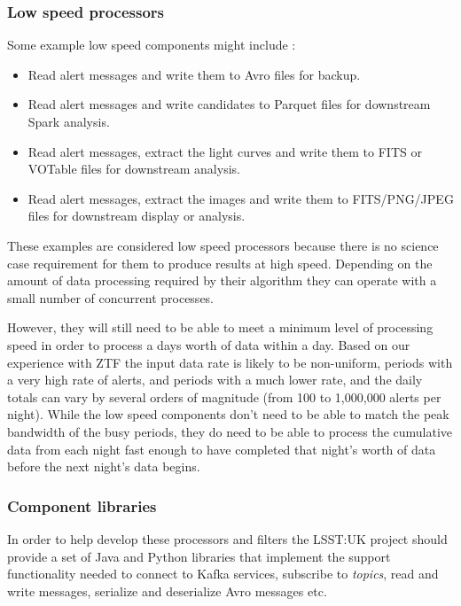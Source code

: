 \documentclass{article}
\newcommand{\avro} {Avro\xspace}
\newcommand{\fits} {FITS\xspace}
\newcommand{\parquet} {Parquet\xspace}
\newcommand{\votable} {VOTable\xspace}
\newcommand{\kafka} {Kafka\xspace}
\newcommand{\spark} {Spark\xspace}
\newcommand{\kftopics} {\textit{topics}\xspace}
\newcommand{\serz}      {serialize\xspace}
\newcommand{\deserz}    {deserialize\xspace}
\newcommand{\ztf} {ZTF\xspace}
\newcommand{\lsstuk} {LSST:UK\xspace}
\begin{document}
\subsubsection{Low speed processors}
\label{stage-2.low-speed.processors}

Some example low speed components might include :
\begin{itemize}
  \item Read alert messages and write them to \avro files for backup.
  \item Read alert messages and write candidates to \parquet files for downstream \spark analysis.
  \item Read alert messages, extract the light curves and write them to \fits or \votable files for downstream analysis.
  \item Read alert messages, extract the images and write them to FITS/PNG/JPEG files for downstream display or analysis.
\end{itemize}

These examples are considered low speed processors because there is no science case requirement for them to produce results at high speed. Depending on the amount of data processing required by their algorithm they can operate with a small number of concurrent processes.

However, they will still need to be able to meet a minimum level of processing speed in order to process a days worth of data within a day. Based on our experience with \ztf the input data rate is likely to be non-uniform, periods with a very high rate of alerts, and periods with a much lower rate, and the daily totals can vary by several orders of magnitude (from 100 to 1,000,000 alerts per night).
While the low speed components don't need to be able to match the peak bandwidth of the busy periods, they do need to be able to process the cumulative data from each night fast enough to have completed that night's worth of data before the next night's data begins.

\subsubsection{Component libraries}
\label{stage-2.component-libraries}

In order to help develop these processors and filters the \lsstuk project should provide a set of Java and Python libraries that implement the support functionality needed to connect to \kafka services, subscribe to \kftopics, read and write messages, \serz and \deserz \avro messages etc.
\end{document}
